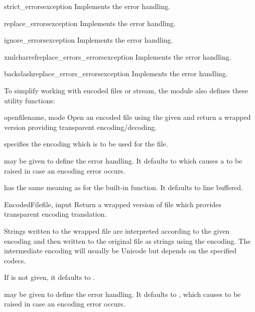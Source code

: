 \begin{funcdesc}{strict_errors}{exception}
Implements the  error handling.
\end{funcdesc}

\begin{funcdesc}{replace_errors}{exception}
Implements the  error handling.
\end{funcdesc}

\begin{funcdesc}{ignore_errors}{exception}
Implements the  error handling.
\end{funcdesc}

\begin{funcdesc}{xmlcharrefreplace_errors_errors}{exception}
Implements the  error handling.
\end{funcdesc}

\begin{funcdesc}{backslashreplace_errors_errors}{exception}
Implements the  error handling.
\end{funcdesc}

To simplify working with encoded files or stream, the module
also defines these utility functions:

\begin{funcdesc}{open}{filename, mode}
Open an encoded file using the given  and return
a wrapped version providing transparent encoding/decoding.


 specifies the encoding which is to be used for the
file.

 may be given to define the error handling. It defaults
to  which causes a  to be raised
in case an encoding error occurs.

 has the same meaning as for the built-in
 function.  It defaults to line buffered.
\end{funcdesc}

\begin{funcdesc}{EncodedFile}{file, input}
Return a wrapped version of file which provides transparent
encoding translation.

Strings written to the wrapped file are interpreted according to the
given  encoding and then written to the original file as
strings using the  encoding. The intermediate encoding will
usually be Unicode but depends on the specified codecs.

If  is not given, it defaults to .

 may be given to define the error handling. It defaults to
, which causes  to be raised in case
an encoding error occurs.
\end{funcdesc}

